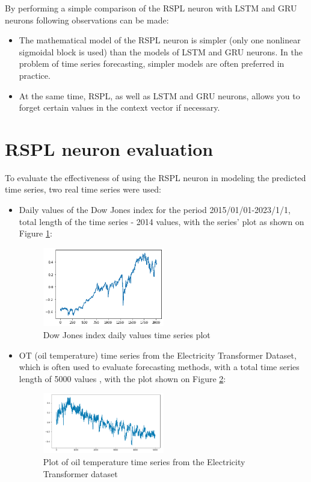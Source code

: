\documentclass[sn-apa]{sn-jnl}%
\begin{document}
By performing a simple comparison of the RSPL neuron with LSTM and GRU neurons following observations can be made:

\begin{itemize}
\item The mathematical model of the RSPL neuron is simpler (only one nonlinear sigmoidal block is used) than the models of LSTM and GRU neurons. In the problem of time series forecasting, simpler models are often preferred in practice. 
\item At the same time, RSPL, as well as LSTM and GRU neurons, allows you to forget certain values in the context vector if necessary. 
\end{itemize}

\section{RSPL neuron evaluation}\label{sec6}
To evaluate the effectiveness of using the RSPL neuron in modeling the predicted time series, two real time series were used: 

\begin{itemize}
\item Daily values of the Dow Jones index for the period 2015/01/01-2023/1/1, total length of the time series - 2014 values, with the series' plot as shown on Figure \ref{fig8}:
\begin{figure}[H]
\centering
\includegraphics[width=0.5\textwidth]{Fig8.png}
\caption{Dow Jones index daily values time series plot}\label{fig8}
\end{figure}
\item OT (oil temperature) time series from the Electricity Transformer Dataset, which is often used to evaluate forecasting methods, with a total time series length of 5000 values \citep{haoyietal-informer-2021}, with the plot shown on Figure \ref{fig9}:
\begin{figure}[H]
\centering
\includegraphics[width=0.5\textwidth]{Fig9.png}
\caption{Plot of oil temperature time series from the Electricity Transformer dataset}\label{fig9}
\end{figure}
\end{itemize}
\end{document}
